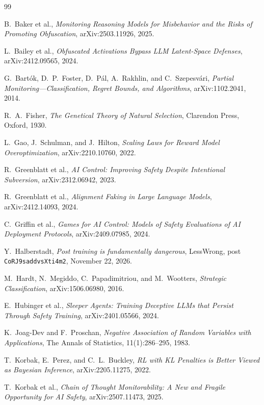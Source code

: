 \documentclass[11pt,a4paper]{article}
\begin{document}
\begin{thebibliography}{99}

B.~Baker et al.,
\emph{Monitoring Reasoning Models for Misbehavior and the Risks of Promoting Obfuscation},
arXiv:2503.11926, 2025.

L.~Bailey et al.,
\emph{Obfuscated Activations Bypass LLM Latent-Space Defenses},
arXiv:2412.09565, 2024.

G.~Bart\'ok, D.~P.~Foster, D.~P\'al, A.~Rakhlin, and C.~Szepesv\'ari,
\emph{Partial Monitoring---Classification, Regret Bounds, and Algorithms},
arXiv:1102.2041, 2014.

R.~A.~Fisher,
\emph{The Genetical Theory of Natural Selection},
Clarendon Press, Oxford, 1930.

L.~Gao, J.~Schulman, and J.~Hilton,
\emph{Scaling Laws for Reward Model Overoptimization},
arXiv:2210.10760, 2022.

R.~Greenblatt et al.,
\emph{AI Control: Improving Safety Despite Intentional Subversion},
arXiv:2312.06942, 2023.

R.~Greenblatt et al.,
\emph{Alignment Faking in Large Language Models},
arXiv:2412.14093, 2024.

C.~Griffin et al.,
\emph{Games for AI Control: Models of Safety Evaluations of AI Deployment Protocols},
arXiv:2409.07985, 2024.

Y.~Halberstadt,
\emph{Post training is fundamentally dangerous},
LessWrong, post \texttt{CoRJ9saddvsXti4m2}, November 22, 2026.

M.~Hardt, N.~Megiddo, C.~Papadimitriou, and M.~Wootters,
\emph{Strategic Classification},
arXiv:1506.06980, 2016.

E.~Hubinger et al.,
\emph{Sleeper Agents: Training Deceptive LLMs that Persist Through Safety Training},
arXiv:2401.05566, 2024.

K.~Joag-Dev and F.~Proschan,
\emph{Negative Association of Random Variables with Applications},
The Annals of Statistics, 11(1):286--295, 1983.

T.~Korbak, E.~Perez, and C.~L.~Buckley,
\emph{RL with KL Penalties is Better Viewed as Bayesian Inference},
arXiv:2205.11275, 2022.

T.~Korbak et al.,
\emph{Chain of Thought Monitorability: A New and Fragile Opportunity for AI Safety},
arXiv:2507.11473, 2025.


\end{thebibliography}
\end{document}
